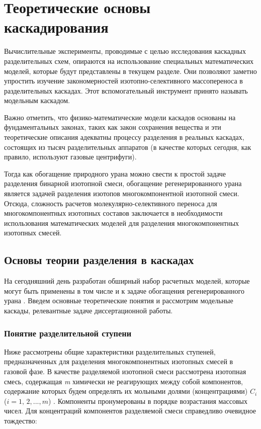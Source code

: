 \chapter{Теоретические основы каскадирования}

Вычислительные эксперименты, проводимые с целью исследования каскадных разделительных схем, опираются на использование специальных математических моделей, которые будут представлены в текущем разделе. Они позволяют заметно упростить изучение закономерностей изотопно-селективного массопереноса в разделительных каскадах. Этот вспомогательный инструмент принято называть модельным каскадом.

Важно отметить, что физико-математические модели каскадов основаны на фундаментальных законах, таких как закон сохранения вещества и эти теоретические описания адекватны процессу разделения в реальных каскадах, состоящих из тысяч разделительных аппаратов (в качестве которых сегодня, как правило, используют газовые центрифуги).

Тогда как обогащение природного урана можно свести к простой задаче разделения бинарной изотопной смеси, обогащение регенерированного урана является задачей разделения изотопов многокомпонентной изотопной смеси. Отсюда, сложность расчетов молекулярно-селективного переноса для многокомпонентных изотопных составов заключается в необходимости использования математических моделей для разделения многокомпонентных изотопных смесей.

\section{Основы теории разделения в каскадах}

На сегодняшний день разработан обширный набор расчетных моделей, которые могут быть применены в том числе и к задаче обогащения регенерированного урана \cite{smirnovMolekulyarnoselektivnyyMassoperenosKomponentov2013}. Введем основные теоретические понятия и рассмотрим модельные каскады, релевантные задаче диссертационной работы.

\subsection{Понятие разделительной ступени}

Ниже рассмотрены общие характеристики разделительных ступеней, предназначенных для разделения многокомпонентных изотопных смесей в газовой фазе. В качестве разделяемой изотопной смеси рассмотрена изотопная смесь, содержащая \textit{m} химически не реагирующих между собой компонентов, содержание которых будем определять их мольными долями (концентрациями) $C_{i}$ ($i=1,\, 2,...,m$) \cite{sulaberidzeTeoriyaKaskadovDlya2011}. Компоненты пронумерованы в порядке возрастания массовых чисел. Для концентраций компонентов разделяемой смеси справедливо очевидное тождество:

